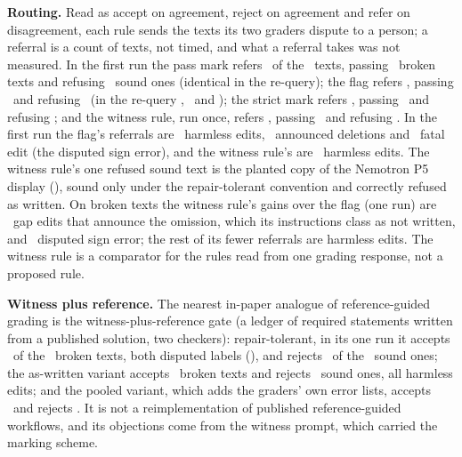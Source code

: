 \textbf{Routing.} Read as accept on agreement, reject on agreement and refer on disagreement, each rule sends the texts its two graders dispute to a person; a referral is a count of texts, not timed, and what a referral takes was not measured. In the first run the pass mark refers \CRRoutePassRefP\ of the \CRNTexts\ texts, passing \CRRoutePassBrokenP\ broken texts and refusing \CRRoutePassSoundP\ sound ones (identical in the re-query); the flag refers \CRRouteFlagRefP, passing \CRRouteFlagBrokenP\ and refusing \CRRouteFlagSoundP\ (in the re-query \CRRouteFlagRefR, \CRRouteFlagBrokenR\ and \CRRouteFlagSoundR); the strict mark refers \CRRouteStrictRefP, passing \CRRouteStrictBrokenP\ and refusing \CRRouteStrictSoundP; and the witness rule, run once, refers \CRRouteWitnessRefP, passing \CRRouteWitnessBrokenP\ and refusing \CRRouteWitnessSoundP. In the first run the flag's referrals are \CRRouteFlagRefHP\ harmless edits, \CRRouteFlagRefGP\ announced deletions and \CRRouteFlagRefFP\ fatal edit (the disputed sign error), and the witness rule's are \CRRouteWitnessRefHP\ harmless edits. The witness rule's one refused sound text is the planted copy of the Nemotron P5 display (\CRIdGptPfiveH), sound only under the repair-tolerant convention and correctly refused as written. On broken texts the witness rule's gains over the flag (one run) are \CRWitnessGainFlagGapP\ gap edits that announce the omission, which its instructions class as not written, and \CRWitnessGainFlagFatalP\ disputed sign error; the rest of its fewer referrals are harmless edits. The witness rule is a comparator for the rules read from one grading response, not a proposed rule.

\textbf{Witness plus reference.} The nearest in-paper analogue of reference-guided grading is the witness-plus-reference gate (a ledger of required statements written from a published solution, two checkers): repair-tolerant, in its one run it accepts \CRRefWitBrokenAccP\ of the \CRNBroken\ broken texts, both disputed labels (\CRRefWitBrokenAccDisputedP), and rejects \CRRefWitSoundRejP\ of the \CRNSound\ sound ones; the as-written variant accepts \CRRefWitAWBrokenAccP\ broken texts and rejects \CRRefWitAWSoundRejP\ sound ones, all harmless edits; and the pooled variant, which adds the graders' own error lists, accepts \CRRefAllBrokenAccP\ and rejects \CRRefAllSoundRejP. It is not a reimplementation of published reference-guided workflows, and its objections come from the witness prompt, which carried the marking scheme.

